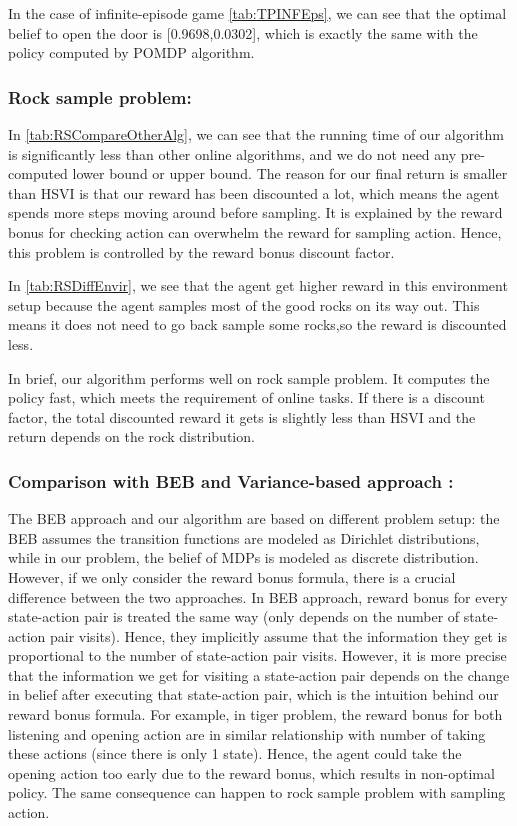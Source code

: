 \documentclass{article}
\begin{document}
In the case of infinite-episode game \autoref{tab:TPINFEps}, we can see that the optimal belief
to open the door is [0.9698,0.0302], which is exactly the same with the policy computed by POMDP
algorithm.

\subsubsection{Rock sample problem:} 
In \autoref{tab:RSCompareOtherAlg}, we can see that
the running time of our algorithm is significantly less than other online algorithms,
and we do not need any pre-computed lower bound or upper bound. The reason for our final
return is smaller than HSVI is that our reward has been discounted a lot, which means the
agent spends more steps moving around before sampling. It is explained by the reward bonus
for checking action can overwhelm the reward for sampling action. Hence, this problem is
controlled by the reward bonus discount factor.

In \autoref{tab:RSDiffEnvir}, we see that the agent get higher reward in this environment 
setup because the agent samples most of the good rocks on its way out. This means it does
not need to go back sample some rocks,so the reward is discounted less.

In brief, our algorithm performs well on rock sample problem. It computes the policy fast,
which meets the requirement of online tasks. If there is a discount factor, the total 
discounted reward it gets is slightly less than HSVI and the return depends on the rock 
distribution.

\subsubsection{Comparison with BEB \cite{kolter} and Variance-based approach \cite{sorg}:}

The BEB approach \cite{kolter} and our algorithm are based on different problem setup: the BEB
assumes the transition functions are modeled as Dirichlet distributions, while in our problem, the 
belief of MDPs is modeled as discrete distribution. However, if we only consider the reward
bonus formula, there is a crucial difference between the two approaches. In BEB approach, 
reward bonus for every state-action pair is treated the same way (only depends on the number
of state-action pair visits). Hence, they implicitly assume that the information they get
is proportional to the number of state-action pair visits. However, it is more precise that
the information we get for visiting a state-action pair depends on the change in belief
after executing that state-action pair, which is the intuition behind our reward bonus formula.
For example, in tiger problem, the reward bonus for both listening and opening action are in
similar relationship with number of taking these actions (since there is only 1 state). Hence,
the agent could take the opening action too early due to the reward bonus, which results in
non-optimal policy. The same consequence can happen to rock sample problem with sampling action.
\end{document}
